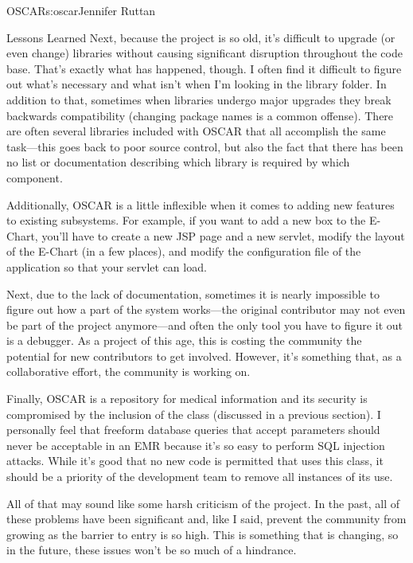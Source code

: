 \begin{aosachapter}{OSCAR}{s:oscar}{Jennifer Ruttan}
\begin{aosasect1}{Lessons Learned}
Next, because the project is so old, it's difficult to upgrade (or
even change) libraries without causing significant disruption
throughout the code base. That's exactly what has happened, though. I
often find it difficult to figure out what's necessary and what isn't
when I'm looking in the library folder. In addition to that, sometimes
when libraries undergo major upgrades they break backwards
compatibility (changing package names is a common offense). There are
often several libraries included with OSCAR that all accomplish the same
task---this goes back to poor source control, but also the fact that
there has
been no list or documentation describing which library is required by
which component.

Additionally, OSCAR is a little inflexible when it comes to adding new
features to existing subsystems. For example, if you want to add a new
box to the E-Chart, you'll have to create a new JSP page and a new
servlet, modify the layout of the E-Chart (in a few places), and
modify the configuration file of the application so that your servlet
can load.

Next, due to the lack of documentation, sometimes it is nearly
impossible to figure out how a part of the system works---the original
contributor may not even be part of the project anymore---and often
the only tool you have to figure it out is a debugger. As a project of
this age, this is costing the community the potential for new
contributors to get involved. However, it's something that, as a
collaborative effort, the community is working on.

Finally, OSCAR is a repository for medical information and its
security is compromised by the inclusion of the  class
(discussed in a previous section). I personally feel that freeform
database queries that accept parameters should never be acceptable in
an EMR because it's so easy to perform SQL injection attacks. While
it's good that no new code is permitted that uses this class, it
should be a priority of the development team to remove all instances
of its use.

All of that may sound like some harsh criticism of the project. In the
past, all of these problems have been significant and, like I said,
prevent the community from growing as the barrier to entry is so
high. This is something that is changing, so in the future, these
issues won't be so much of a hindrance.


\end{aosasect1}
\end{aosachapter}

